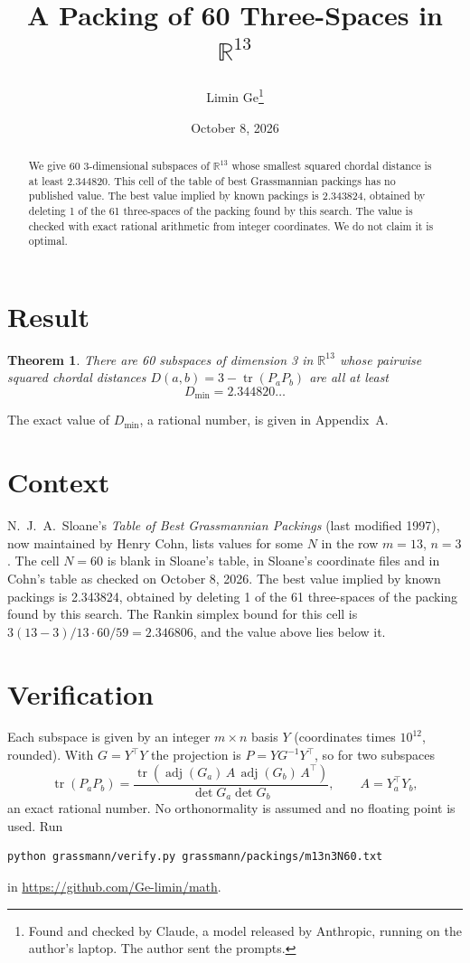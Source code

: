 \documentclass[11pt,a4paper]{article}
\title{A Packing of 60 Three-Spaces in $\mathbb{R}^{13}$}
\author{Limin Ge\thanks{Found and checked by Claude, a model released by Anthropic, running on the author's laptop. The author sent the prompts.}}
\date{October 8, 2026}
\newtheorem*{theorem}{Theorem}
\begin{document}
\maketitle
\begin{abstract}
We give 60 3-dimensional subspaces of $\mathbb{R}^{13}$ whose smallest squared chordal distance is at least 2.344820. This cell of the table of best Grassmannian packings has no published value. The best value implied by known packings is 2.343824, obtained by deleting 1 of the 61 three-spaces of the packing found by this search. The value is checked with exact rational arithmetic from integer coordinates. We do not claim it is optimal.
\end{abstract}

\section{Result}
\begin{theorem}
There are 60 subspaces of dimension 3 in $\mathbb{R}^{13}$ whose pairwise squared chordal distances $D(a,b) = 3 - \operatorname{tr}(P_aP_b)$ are all at least
\[ D_{\min} = 2.344820\ldots \]
\end{theorem}
The exact value of $D_{\min}$, a rational number, is given in Appendix~A.


\section{Context}
N.~J.~A.~Sloane's \emph{Table of Best Grassmannian Packings} (last modified 1997), now maintained by Henry Cohn, lists values for some $N$ in the row $m=13$, $n=3$. The cell $N=60$ is blank in Sloane's table, in Sloane's coordinate files and in Cohn's table as checked on October 8, 2026. The best value implied by known packings is 2.343824, obtained by deleting 1 of the 61 three-spaces of the packing found by this search. The Rankin simplex bound for this cell is $3(13-3)/13\cdot 60/59 = 2.346806$, and the value above lies below it.


\section{Verification}
Each subspace is given by an integer $m\times n$ basis $Y$ (coordinates times $10^{12}$, rounded). With $G=Y^\top Y$ the projection is $P=YG^{-1}Y^\top$, so for two subspaces
\[ \operatorname{tr}(P_aP_b)=\frac{\operatorname{tr}(\operatorname{adj}(G_a)\,A\,\operatorname{adj}(G_b)\,A^\top)}{\det G_a\det G_b},\qquad A=Y_a^\top Y_b, \]
an exact rational number. No orthonormality is assumed and no floating point is used. Run
\begin{verbatim}
python grassmann/verify.py grassmann/packings/m13n3N60.txt
\end{verbatim}
in \url{https://github.com/Ge-limin/math}.
\end{document}
